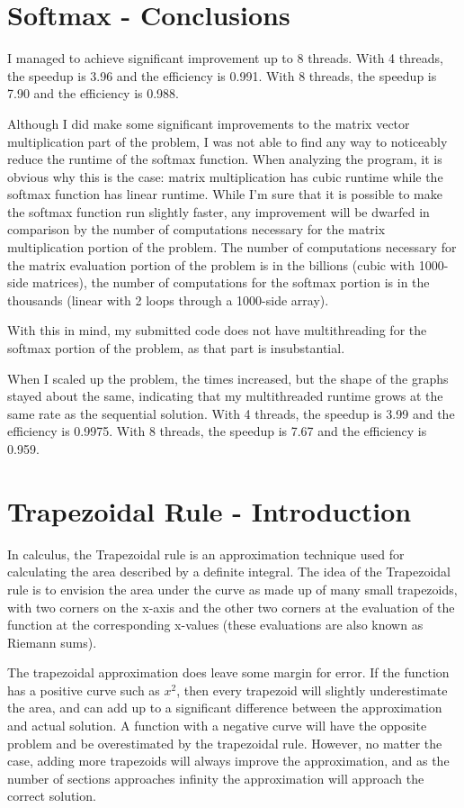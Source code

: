\documentclass[a4paper]{article}
\begin{document}
\section{Softmax - Conclusions}
I managed to achieve significant improvement up to 8 threads. With 4 threads, the speedup is 3.96 and the efficiency is 0.991. With 8 threads, the speedup is 7.90 and the efficiency is 0.988.

Although I did make some significant improvements to the matrix vector multiplication part of the problem, I was not able to find any way to noticeably reduce the runtime of the softmax function. When analyzing the program, it is obvious why this is the case: matrix multiplication has cubic runtime while the softmax function has linear runtime. While I'm sure that it is possible to make the softmax function run slightly faster, any improvement will be dwarfed in comparison by the number of computations necessary for the matrix multiplication portion of the problem. The number of computations necessary for the matrix evaluation portion of the problem is in the billions (cubic with 1000-side matrices), the number of computations for the softmax portion is in the thousands (linear with 2 loops through a 1000-side array).

With this in mind, my submitted code does not have multithreading for the softmax portion of the problem, as that part is insubstantial.

When I scaled up the problem, the times increased, but the shape of the graphs stayed about the same, indicating that my multithreaded runtime grows at the same rate as the sequential solution. With 4 threads, the speedup is 3.99 and the efficiency is 0.9975. With 8 threads, the speedup is 7.67 and the efficiency is 0.959.

\section{Trapezoidal Rule - Introduction}
In calculus, the Trapezoidal rule is an approximation technique used for calculating the area described by a definite integral. The idea of the Trapezoidal rule is to envision the area under the curve as made up of many small trapezoids, with two corners on the x-axis and the other two corners at the evaluation of the function at the corresponding x-values (these evaluations are also known as Riemann sums). 

The trapezoidal approximation does leave some margin for error. If the function has a positive curve such as $x^2$, then every trapezoid will slightly underestimate the area, and can add up to a significant difference between the approximation and actual solution. A function with a negative curve will have the opposite problem and be overestimated by the trapezoidal rule. However, no matter the case, adding more trapezoids will always improve the approximation, and as the number of sections approaches infinity the approximation will approach the correct solution.
\end{document}
